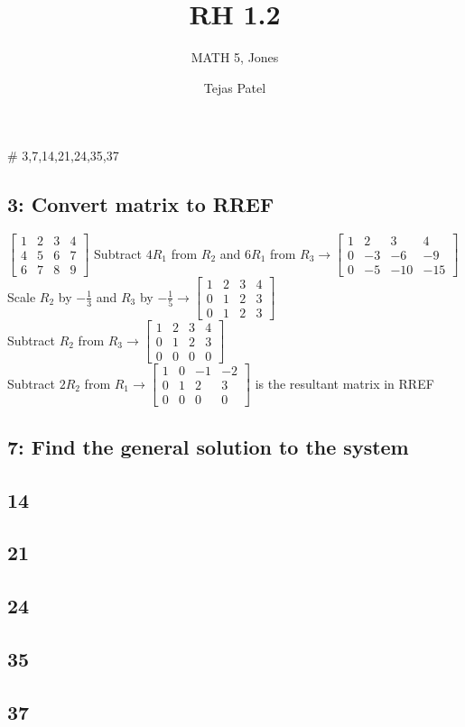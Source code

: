 \documentclass{article}
\title{RH 1.2}
\author{MATH 5, Jones}
\date{Tejas Patel}
\begin{document}
\maketitle
\# 3,7,14,21,24,35,37
\subsection*{3: Convert matrix to RREF}
$
\left[\begin{array}{ccc|c}
    1 & 2 & 3 & 4 \\
    4 & 5 & 6 & 7 \\
    6 & 7 & 8 & 9 
\end{array}\right]
$ Subtract $4R_1$ from $R_2$ and $6R_1$ from $R_3 \rightarrow
\left[\begin{array}{ccc|c}
    1 & 2 & 3 & 4 \\
    0 & -3 & -6 & -9 \\
    0 & -5 & -10 & -15 
\end{array}\right]
$\\[0.1in]Scale $R_2$ by $-\frac{1}{3}$ and $R_3$ by $-\frac{1}{5} \rightarrow 
\left[\begin{array}{ccc|c}
    1 & 2 & 3 & 4 \\
    0 & 1 & 2 & 3 \\
    0 & 1 & 2 & 3 
\end{array}\right]$ \\[0.1in] Subtract $R_2$ from $R_3 \rightarrow
\left[\begin{array}{ccc|c}
    1 & 2 & 3 & 4 \\
    0 & 1 & 2 & 3 \\
    0 & 0 & 0 & 0 
\end{array}\right]$ \\[0.1in] Subtract $2R_2$ from $R_1 \rightarrow
\boxed{\left[\begin{array}{ccc|c}
    1 & 0 & -1 & -2 \\
    0 & 1 & 2 & 3 \\
    0 & 0 & 0 & 0 
\end{array}\right]}
$ is the resultant matrix in RREF
\subsection*{7: Find the general solution to the system}








\subsection*{14}
\subsection*{21}
\subsection*{24}
\subsection*{35}
\subsection*{37}
\end{document}
